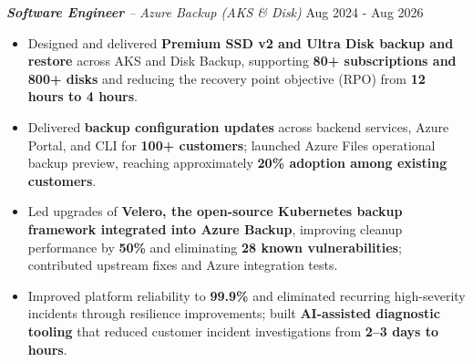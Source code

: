 \textit{\textbf{Software Engineer} – Azure Backup (AKS \& Disk)}
\hfill {\faCalendar} Aug 2024 - Aug 2026 \par
\begin{itemize}
  \item Designed and delivered \textbf{Premium SSD v2 and Ultra Disk backup and restore} across AKS and Disk Backup, supporting \textbf{80+ subscriptions and 800+ disks} and reducing the recovery point objective (RPO) from \textbf{12 hours to 4 hours}.

  \item Delivered \textbf{backup configuration updates} across backend services, Azure Portal, and CLI for \textbf{100+ customers}; launched Azure Files operational backup preview, reaching approximately \textbf{20\% adoption among existing customers}.

  \item Led upgrades of \textbf{Velero, the open-source Kubernetes backup framework integrated into Azure Backup}, improving cleanup performance by \textbf{50\%} and eliminating \textbf{28 known vulnerabilities}; contributed upstream fixes and Azure integration tests.

  \item Improved platform reliability to \textbf{99.9\%} and eliminated recurring high-severity incidents through resilience improvements; built \textbf{AI-assisted diagnostic tooling} that reduced customer incident investigations from \textbf{2--3 days to hours}.
\end{itemize}